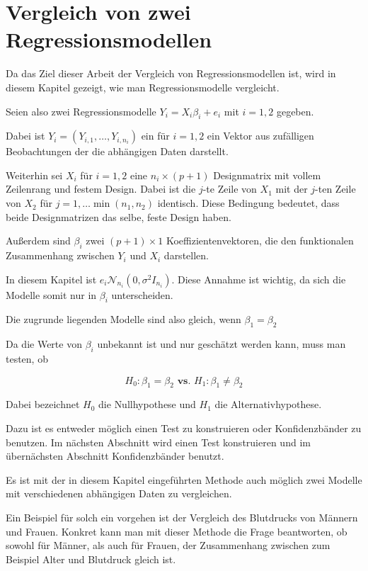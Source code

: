 \documentclass[12pt,a4paper]{article}
\theoremstyle{definition}
\theoremstyle{definition}
\theoremstyle{definition}
\begin{document}
\newpage
\section{Vergleich von zwei Regressionsmodellen}
\label{Vergleich von zwei Regressionsmodellen}
Da das Ziel dieser Arbeit der Vergleich von Regressionsmodellen ist, wird in diesem Kapitel gezeigt, wie man Regressionsmodelle vergleicht. 

Seien also zwei Regressionsmodelle $ Y_{i} = X_{i} \beta_{i} + e_{i} $ \label{Grundmodell_Hypothesentest} mit $i = 1,2$ gegeben. 

Dabei ist $Y_{i} = (Y_{i,1}, \ldots, Y_{i,n_i})$ ein für $i=1,2$ ein Vektor aus zufälligen Beobachtungen der die abhängigen Daten darstellt.

Weiterhin sei $X_i$ für $i=1,2$ eine $n_i \times (p+1)$ Designmatrix mit vollem Zeilenrang und festem Design. Dabei ist die $j$-te Zeile von $X_1$ mit der $j$-ten Zeile von $X_2$ für $j=1,\ldots \min(n_1,n_2)$ identisch. Diese Bedingung bedeutet, dass beide Designmatrizen das selbe, feste Design haben.

Außerdem sind $\beta_i$ zwei $(p+1) \times 1$ Koeffizientenvektoren, die den funktionalen Zusammenhang zwischen $Y_i$ und $X_i$ darstellen.

In diesem Kapitel ist $e_i \mathscr{N}_{n_i}(0,\sigma^2 I_{n_i})$. Diese Annahme ist wichtig, da sich die Modelle somit nur in $\beta_i$ unterscheiden.

Die zugrunde liegenden Modelle sind also gleich, wenn $\beta_{1}=\beta_{2}$ 

Da die Werte von $\beta_{i}$ unbekannt ist und nur geschätzt werden kann, muss man testen, ob 

\begin{equation}
H_{0} : \beta_{1} = \beta_{2}  \textbf{ vs. }  H_{1} : \beta_{1} \neq \beta_{2} \label{Hypothese}
\end{equation}

Dabei bezeichnet $H_{0}$ die \gls{Nullhypothese} und $H_{1}$ die Alternativhypothese.

Dazu ist es entweder möglich einen Test zu konstruieren oder Konfidenzbänder zu benutzen. Im nächsten Abschnitt wird einen Test konstruieren und im übernächsten Abschnitt Konfidenzbänder benutzt.

Es ist mit der in diesem Kapitel eingeführten Methode auch möglich zwei Modelle mit verschiedenen abhängigen Daten zu vergleichen. 

Ein Beispiel für solch ein vorgehen ist der Vergleich des Blutdrucks von Männern und Frauen. Konkret kann man mit dieser Methode die Frage beantworten, ob sowohl für Männer, als auch für Frauen, der Zusammenhang zwischen zum Beispiel Alter und Blutdruck gleich ist.
\end{document}
